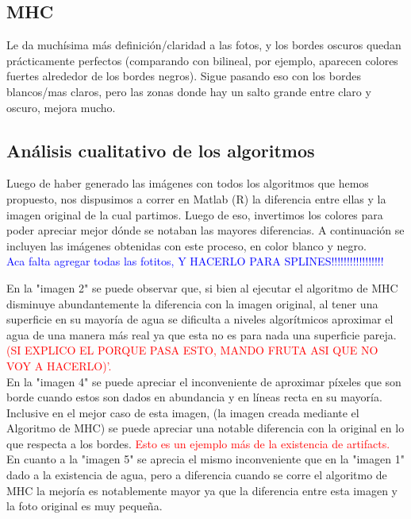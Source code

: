 \documentclass[a4paper]{article}
\begin{document}
\subsection{MHC}
Le da muchísima más definición/claridad a las fotos, y los bordes oscuros quedan prácticamente perfectos (comparando con bilineal, por ejemplo, aparecen colores fuertes alrededor de los bordes negros). Sigue pasando eso con los bordes blancos/mas claros, pero las zonas donde hay un salto grande entre claro y oscuro, mejora mucho.

\subsection{An\'alisis cualitativo de los algoritmos}
Luego de haber generado las im\'agenes con todos los algoritmos que hemos propuesto, nos dispusimos a correr en Matlab (R) la diferencia entre ellas y la imagen original de la cual partimos. Luego de eso, invertimos los colores para poder apreciar mejor d\'onde se notaban las mayores diferencias. A continuaci\'on se incluyen las im\'agenes obtenidas con este proceso, en color blanco y negro.\\

\textcolor{blue}{Aca falta agregar todas las fotitos, Y HACERLO PARA SPLINES!!!!!!!!!!!!!!!!!}


En la "imagen 2"  se puede observar que, si bien al ejecutar el algoritmo de MHC disminuye abundantemente la diferencia con la imagen original, al tener una superficie en su mayor\'ia de agua se dificulta a niveles algor\'itmicos aproximar el agua de una manera m\'as real ya que esta no es para nada una superficie pareja. \textcolor{red}{(SI EXPLICO EL PORQUE PASA ESTO, MANDO FRUTA ASI QUE NO VOY A HACERLO)'.}\\

En la "imagen 4" se puede apreciar el inconveniente de aproximar p\'ixeles que son borde cuando estos son dados en abundancia y en l\'ineas recta en su mayor\'ia. Inclusive en el mejor caso de esta imagen, (la imagen creada mediante el Algoritmo de MHC) se puede apreciar una notable diferencia con la original en lo que respecta a los bordes. \textcolor{red}{Esto es un ejemplo m\'as de la existencia de artifacts.}\\

En cuanto a la "imagen 5" se aprecia el mismo inconveniente que en la "imagen 1" dado a la existencia de agua, pero a diferencia cuando se corre el algoritmo de MHC la mejor\'ia es notablemente mayor ya que la diferencia entre esta imagen y la foto original es muy peque\~na.\\
\end{document}
